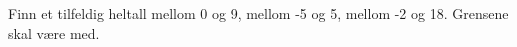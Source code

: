 %
%
Finn et tilfeldig heltall mellom 0 og 9, mellom -5 og 5, mellom -2 og 18. Grensene skal være med.
